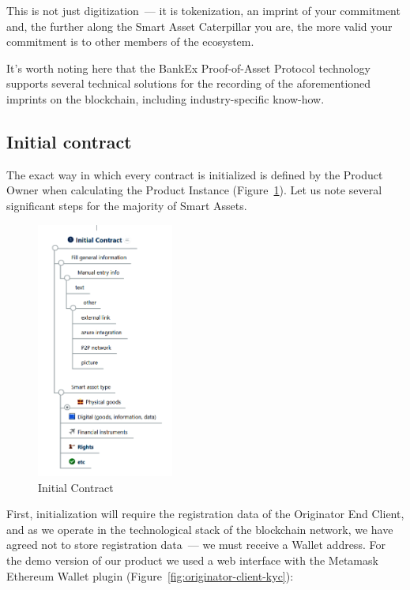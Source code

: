 \documentclass{article}
\begin{document}
\begin{multicols}{2}
This is not just digitization~--- it is tokenization, an imprint of your commitment and, the further along the Smart Asset Caterpillar you are, the more valid your commitment is to other members of the ecosystem.

It's worth noting here that the BankEx Proof-of-Asset Protocol technology supports several technical solutions for the recording of the aforementioned imprints on the blockchain, including industry-specific know-how. 

\subsection{Initial contract}

The exact way in which every contract is initialized is defined by the Product Owner when calculating the Product Instance (Figure~\ref{fig:initial-contract}). Let us note several significant steps for the majority of Smart Assets.

\begin{figure}
  \centering
  \includegraphics[width=0.4\textwidth]{initial-contract.png}
  \caption{Initial Contract}
  \label{fig:initial-contract}
\end{figure}

First, initialization will require the registration data of the Originator End Client, and as we operate in the technological stack of the blockchain network, we have agreed not to store registration data~--- we must receive a Wallet address. For the demo version of our product we used a web interface with the Metamask Ethereum Wallet plugin (Figure~\ref{fig:originator-client-kyc}):


\end{multicols}
\end{document}
